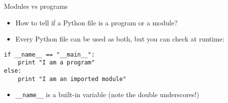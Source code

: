 \begin{frame}[fragile]{Modules vs programs}
	\begin{itemize}
		\pause\item How to tell if a Python file is a program or a module?
		\pause\item Every Python file can be used as both, but you can check
			at runtime:
	\end{itemize}
	\begin{lstlisting}
if __name__ == "__main__":
    print "I am a program"
else:
    print "I am an imported module"
	\end{lstlisting}
	\begin{itemize}
		\pause\item \lstinline{__name__} is a built-in variable (note the
			double underscores!)
	\end{itemize}
\end{frame}

